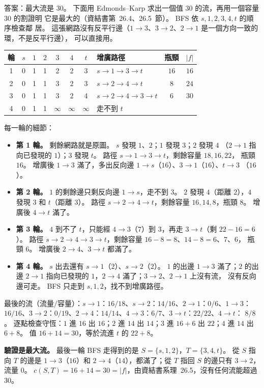 \begin{pastsoln}
答案：最大流是 $30$。 下面用 Edmonds--Karp 求出一個值 $30$ 的流，再用一個容量 $30$ 的割證明
它是最大的（資結書第~26.4、26.5~節）。 BFS 依 $s, 1, 2, 3, 4, t$ 的順序檢查鄰
居。 這張網路沒有反平行邊（$1 \to 3$、$3 \to 2$、$2 \to 1$ 是一個方向一致的環，不是反平行邊），
可以直接用。

\begin{center}
\small
\begin{tabular}{c|cccccc|lcc}
\toprule
輪 & $s$ & $1$ & $2$ & $3$ & $4$ & $t$ & 增廣路徑 & 瓶頸 & $|f|$ \\
\midrule
1 & 0 & 1 & 1 & 2 & 2 & 3 & $s \to 1 \to 3 \to t$ & $16$ & $16$ \\
2 & 0 & 1 & 1 & 3 & 2 & 3 & $s \to 2 \to 4 \to t$ & $8$ & $24$ \\
3 & 0 & 1 & 1 & 3 & 2 & 4 & $s \to 2 \to 4 \to 3 \to t$ & $6$ & $30$ \\
4 & 0 & 1 & 1 & $\infty$ & $\infty$ & $\infty$ & 走不到 $t$ & & \\
\bottomrule
\end{tabular}
\end{center}

每一輪的細節：
\begin{itemize}
\item \textbf{第 1 輪。} 剩餘網路就是原圖。 $s$ 發現 $1$、$2$；$1$ 發現 $3$；$2$ 發現 $4$
（$2 \to 1$ 指向已發現的 $1$）；$3$ 發現 $t$。 路徑 $s \to 1 \to 3 \to t$，剩餘容量 $18, 16, 22$，
瓶頸 $16$。 增廣後 $1 \to 3$ 滿了，多出反向邊 $1 \to s$（$16$）、$3 \to 1$（$16$）、$t \to 3$
（$16$）。
\item \textbf{第 2 輪。} $1$ 的剩餘邊只剩反向邊 $1 \to s$，走不到 $3$。 $2$ 發現 $4$（距離
$2$），$4$ 發現 $3$ 和 $t$（距離 $3$）。 路徑 $s \to 2 \to 4 \to t$，剩餘容量 $16, 14, 8$，瓶頸
$8$。 增廣後 $4 \to t$ 滿了。
\item \textbf{第 3 輪。} $4$ 到不了 $t$，只能經 $4 \to 3$（$7$）到 $3$，再走 $3 \to t$（剩
$22 - 16 = 6$）。 路徑 $s \to 2 \to 4 \to 3 \to t$，剩餘容量 $16 - 8 = 8$、$14 - 8 = 6$、$7$、$6$，
瓶頸 $6$。 增廣後 $2 \to 4$、$3 \to t$ 都滿了。
\item \textbf{第 4 輪。} $s$ 出去還有 $s \to 1$（$2$）、$s \to 2$（$2$）。 $1$ 的出邊 $1 \to 3$
滿了；$2$ 的出邊 $2 \to 1$ 指向已發現的 $1$，$2 \to 4$ 滿了；$3 \to 2$、$2 \to 1$ 上沒有流，
沒有反向邊可走。 BFS 只走到 $s, 1, 2$，找不到增廣路徑。
\end{itemize}

最後的流（流量$/$容量）：$s \to 1$：$16/18$、$s \to 2$：$14/16$、$2 \to 1$：$0/6$、$1 \to 3$：
$16/16$、$3 \to 2$：$0/19$、$2 \to 4$：$14/14$、$4 \to 3$：$6/7$、$3 \to t$：$22/22$、$4 \to t$：
$8/8$。 逐點檢查守恆：$1$ 進 $16$ 出 $16$；$2$ 進 $14$ 出 $14$；$3$ 進 $16 + 6$ 出 $22$；$4$ 進
$14$ 出 $6 + 8$。 值 $16 + 14 = 30$，等於流進 $t$ 的 $22 + 8$。

\textbf{驗證是最大流。} 最後一輪 BFS 走得到的是 $S = \{s, 1, 2\}$，$T = \{3, 4, t\}$。 從 $S$
指向 $T$ 的邊是 $1 \to 3$（$16$）和 $2 \to 4$（$14$），都滿了；從 $T$ 指回 $S$ 的邊只有
$3 \to 2$，流量 $0$。 $c(S, T) = 16 + 14 = 30 = |f|$，由資結書系理~26.5，沒有任何流能超過
$30$。
\end{pastsoln}
